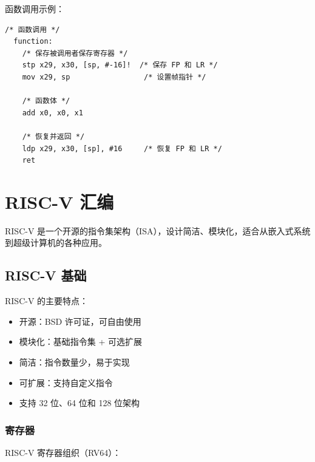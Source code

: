 函数调用示例：
\begin{lstlisting}[language={[ARM]Assembler}]
  /* 函数调用 */
  function:
    /* 保存被调用者保存寄存器 */
    stp x29, x30, [sp, #-16]!  /* 保存 FP 和 LR */
    mov x29, sp                 /* 设置帧指针 */

    /* 函数体 */
    add x0, x0, x1

    /* 恢复并返回 */
    ldp x29, x30, [sp], #16     /* 恢复 FP 和 LR */
    ret
\end{lstlisting}

\section{RISC-V 汇编}

RISC-V 是一个开源的指令集架构（ISA），设计简洁、模块化，适合从嵌入式系统到超级计算机的各种应用。

\subsection{RISC-V 基础}


RISC-V 的主要特点：
\begin{itemize}
  \item 开源：BSD 许可证，可自由使用
  \item 模块化：基础指令集 + 可选扩展
  \item 简洁：指令数量少，易于实现
  \item 可扩展：支持自定义指令
  \item 支持 32 位、64 位和 128 位架构
\end{itemize}

\subsubsection{寄存器}

RISC-V 寄存器组织（RV64）：

